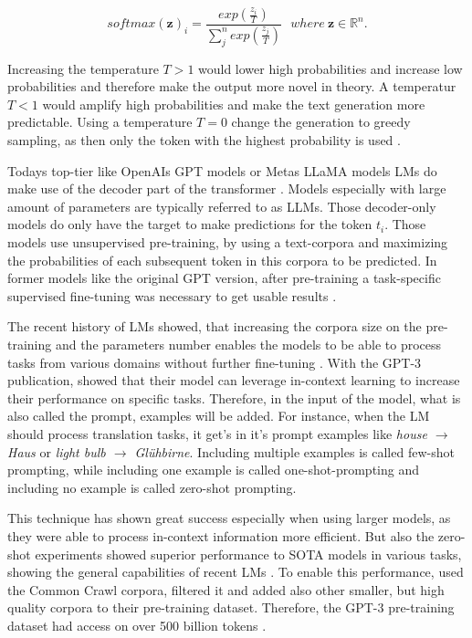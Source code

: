 \documentclass[a4paper,oneside,bibliography=totoc]{scrbook}
\begin{document}
\begin{equation}
  softmax(\mathbf{z})_i = \frac{exp(\frac{z_i}{T})}{\sum^n_j exp(\frac{z_j}{T})}~~~where~\mathbf{z} \in \mathbb{R}^n.
\end{equation}

Increasing the temperature $T>1$ would lower high probabilities and increase low probabilities and therefore make the output more novel in theory. A temperatur $T<1$ would amplify high probabilities and make the text generation more predictable. Using a temperature $T=0$ change the generation to greedy sampling, as then only the token with the highest probability is used \cite{Peeperkorn2024}.

Todays top-tier like OpenAIs \ac{GPT} models or Metas \ac{LLaMA} models \acp{LM} do make use of the decoder part of the transformer \cite{Radford2018,Grattafiori2024}. Models especially with large amount of parameters are typically referred to as \acp{LLM}. Those decoder-only models do only have the target to make predictions for the token $t_i$. Those models use unsupervised pre-training, by using a text-corpora and maximizing the probabilities of each subsequent token in this corpora to be predicted. In former models like the original GPT version, after pre-training a task-specific supervised fine-tuning was necessary to get usable results \cite{Radford2018}.

The recent history of \acp{LM} showed, that increasing the corpora size on the pre-training and the parameters number enables the models to be able to process tasks from various domains without further fine-tuning \cite{Radford2018,Radford2019,Brown2020}. With the GPT-3 publication, \citet{Brown2020} showed that their model can leverage in-context learning to increase their performance on specific tasks. Therefore, in the input of the model, what is also called the prompt, examples will be added. For instance, when the \ac{LM} should process translation tasks, it get's in it's prompt examples like \textit{house $\rightarrow$ Haus} or \textit{light bulb $\rightarrow$ Glühbirne}. Including multiple examples is called few-shot prompting, while including one example is called one-shot-prompting and including no example is called zero-shot prompting.

This technique has shown great success especially when using larger models, as they were able to process in-context information more efficient. But also the zero-shot experiments showed superior performance to SOTA models in various tasks, showing the general capabilities of recent \acp{LM} \cite{Brown2020}. To enable this performance, \citet{Brown2020} used the Common Crawl corpora, filtered it and added also other smaller, but high quality corpora to their pre-training dataset. Therefore, the \ac{GPT}-3 pre-training dataset had access on over 500 billion tokens \cite{Brown2020}.
\end{document}
